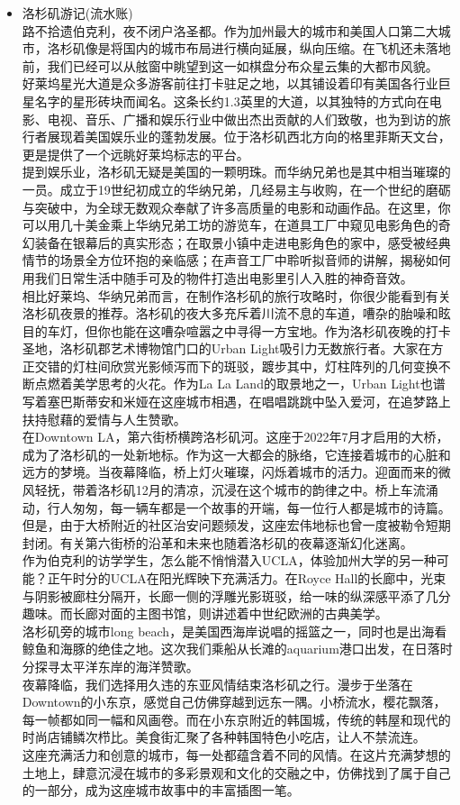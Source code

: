 \begin{itemize}
         \item 洛杉矶游记(流水账) \\
         路不拾遗伯克利，夜不闭户洛圣都。作为加州最大的城市和美国人口第二大城市，洛杉矶像是将国内的城市布局进行横向延展，纵向压缩。在飞机还未落地前，我们已经可以从舷窗中眺望到这一如棋盘分布众星云集的大都市风貌。
好莱坞星光大道是众多游客前往打卡驻足之地，以其铺设着印有美国各行业巨星名字的星形砖块而闻名。这条长约1.3英里的大道，以其独特的方式向在电影、电视、音乐、广播和娱乐行业中做出杰出贡献的人们致敬，也为到访的旅行者展现着美国娱乐业的蓬勃发展。位于洛杉矶西北方向的格里菲斯天文台，更是提供了一个远眺好莱坞标志的平台。\\
提到娱乐业，洛杉矶无疑是美国的一颗明珠。而华纳兄弟也是其中相当璀璨的一员。成立于19世纪初成立的华纳兄弟，几经易主与收购，在一个世纪的磨砺与突破中，为全球无数观众奉献了许多高质量的电影和动画作品。在这里，你可以用几十美金乘上华纳兄弟工坊的游览车，在道具工厂中窥见电影角色的奇幻装备在银幕后的真实形态；在取景小镇中走进电影角色的家中，感受被经典情节的场景全方位环抱的亲临感；在声音工厂中聆听拟音师的讲解，揭秘如何用我们日常生活中随手可及的物件打造出电影里引人入胜的神奇音效。\\
相比好莱坞、华纳兄弟而言，在制作洛杉矶的旅行攻略时，你很少能看到有关洛杉矶夜景的推荐。洛杉矶的夜大多充斥着川流不息的车道，嘈杂的胎噪和眩目的车灯，但你也能在这嘈杂喧嚣之中寻得一方宝地。作为洛杉矶夜晚的打卡圣地，洛杉矶郡艺术博物馆门口的Urban Light吸引力无数旅行者。大家在方正交错的灯柱间欣赏光影倾泻而下的斑驳，踱步其中，灯柱阵列的几何变换不断点燃着美学思考的火花。作为La La Land的取景地之一，Urban Light也谱写着塞巴斯蒂安和米娅在这座城市相遇，在唱唱跳跳中坠入爱河，在追梦路上扶持慰藉的爱情与人生赞歌。\\
在Downtown LA，第六街桥横跨洛杉矶河。这座于2022年7月才启用的大桥，成为了洛杉矶的一处新地标。作为这一大都会的脉络，它连接着城市的心脏和远方的梦境。当夜幕降临，桥上灯火璀璨，闪烁着城市的活力。迎面而来的微风轻抚，带着洛杉矶12月的清凉，沉浸在这个城市的韵律之中。桥上车流涌动，行人匆匆，每一辆车都是一个故事的开端，每一位行人都是城市的诗篇。但是，由于大桥附近的社区治安问题频发，这座宏伟地标也曾一度被勒令短期封闭。有关第六街桥的沿革和未来也随着洛杉矶的夜幕逐渐幻化迷离。\\
作为伯克利的访学学生，怎么能不悄悄潜入UCLA，体验加州大学的另一种可能？正午时分的UCLA在阳光辉映下充满活力。在Royce Hall的长廊中，光束与阴影被廊柱分隔开，长廊一侧的浮雕光影斑驳，给一味的纵深感平添了几分趣味。而长廊对面的主图书馆，则讲述着中世纪欧洲的古典美学。\\
洛杉矶旁的城市long beach，是美国西海岸说唱的摇篮之一，同时也是出海看鲸鱼和海豚的绝佳之地。这次我们乘船从长滩的aquarium港口出发，在日落时分探寻太平洋东岸的海洋赞歌。\\
夜幕降临，我们选择用久违的东亚风情结束洛杉矶之行。漫步于坐落在Downtown的小东京，感觉自己仿佛穿越到远东一隅。小桥流水，樱花飘落，每一帧都如同一幅和风画卷。而在小东京附近的韩国城，传统的韩屋和现代的时尚店铺鳞次栉比。美食街汇聚了各种韩国特色小吃店，让人不禁流连。\\
这座充满活力和创意的城市，每一处都蕴含着不同的风情。在这片充满梦想的土地上，肆意沉浸在城市的多彩景观和文化的交融之中，仿佛找到了属于自己的一部分，成为这座城市故事中的丰富插图一笔。
    \end{itemize}

